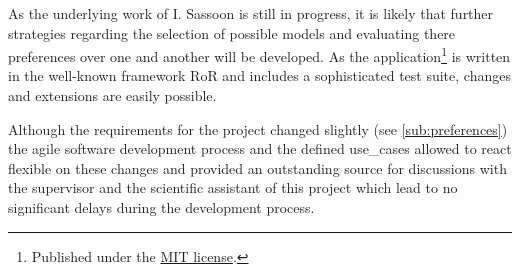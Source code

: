 As the underlying work of I. Sassoon \cite{sassoon2016CD} is still in progress, it is likely that further strategies regarding the selection of possible models and evaluating there preferences over one and another will be developed. As the application\footnote{Published under the \href{https://opensource.org/licenses/MIT}{MIT license}.} is written in the well-known framework \gls{RoR} and includes a sophisticated test suite, changes and extensions are easily possible.
 
Although the requirements for the project changed slightly (see \autoref{sub:preferences}) the agile software development process and the defined \glspl{use_case} allowed to react flexible on these changes and provided an outstanding source for discussions with the supervisor and the scientific assistant of this project which lead to no significant delays during the development process.